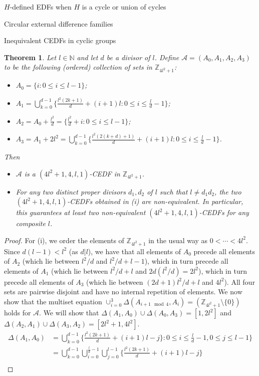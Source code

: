 \documentclass[12pt, a4paper]{article}
\newtheorem{theorem}{Theorem}[section]
\theoremstyle{definition}
\begin{document}
\begin{section}{$H$-defined EDFs when $H$ is a cycle or union of cycles}
\begin{subsection}{Circular external difference families}
\begin{subsection}{Inequivalent CEDFs in cyclic groups}
\begin{theorem}\label{thm:m=4}
Let $l \in \mathbb{N}$ and let $d$ be a divisor of $l$.  Define $\mathcal{A}=(A_0,A_1,A_2,A_3)$ to be the following (ordered) collection of sets in $\mathbb{Z}_{4l^2+1}$:
\begin{itemize}
\item $A_0=\{i: 0 \leq i \leq l-1\}$;
\item $A_1=\bigcup_{k=0}^{d-1}\{\frac{l^2(2k+1)}{d}+(i+1)l: 0 \leq i \leq \frac{l}{d}-1\}$;
\item $A_2=A_0+\frac{l^2}{d}=\{\frac{l^2}{d}+i:0 \leq i \leq l-1\}$;
\item $A_3=A_1+2l^2=\bigcup_{k=0}^{d-1}\{\frac{l^2(2(k+d)+1)}{d}+(i+1)l: 0 \leq i \leq \frac{l}{d}-1\}$.
\end{itemize}
Then
\begin{itemize}
\item[(i)] $\mathcal{A}$ is a $(4l^2+1,4,l,1)$-CEDF in $\mathbb{Z}_{4l^2+1}$.
\item[(ii)] For any two distinct proper divisors $d_1, d_2$ of $l$ such that $l \neq d_1 d_2$, the two $(4l^2+1,4,l,1)$-CEDFs obtained in (i) are non-equivalent. In particular, this guarantees at least two non-equivalent $(4l^2+1,4,l,1)$-CEDFs for any composite $l$.
\end{itemize}
\end{theorem}
\begin{proof}
For (i), we order the elements of $\mathbb{Z}_{4l^2+1}$ in the usual way as $0< \cdots <4l^2$.  Since $d(l-1)<l^2$ (as $d|l$), we have that all elements of $A_0$ precede all elements of $A_2$ (which lie between $l^2/d$ and $l^2/d+l-1$), which in turn precede all elements of $A_1$ (which lie between $l^2/d+l$ and $2d(l^2/d)=2l^2$), which in turn precede all elements of $A_3$ (which lie between $(2d+1)l^2/d+l$ and $4l^2$).  All four sets are pairwise disjoint and have no internal repetition of elements.
We now show that the multiset equation $\cup_{i=0}^{3} \Delta(A_{i+1 \mod 4}, A_i)= (\mathbb{Z}_{4l^2+1} \setminus \{0\})$ holds for $\mathcal{A}$.  We will show that $\Delta(A_1,A_0) \cup \Delta(A_0,A_3)=[1,2l^2]$ and $\Delta(A_2,A_1) \cup \Delta(A_3,A_2)=[2l^2+1,4l^2]$.
\begin{align*}
\Delta(A_1,A_0) &= \bigcup_{k=0}^{d-1}\{\frac{l^2(2k+1)}{d}+(i+1)l-j\}: 0 \leq i \leq \frac{l}{d}-1, 0 \leq j \leq l-1 \}\\
&=\bigcup_{k=0}^{d-1}\bigcup_{i=0}^{\frac{l}{d}-1}\bigcup_{j=0}^{l-1}\{\frac{l^2(2k+1)}{d}+(i+1)l -j \}\\

\end{align*}
\end{proof}
\end{subsection}
\end{subsection}
\end{section}
\end{document}
